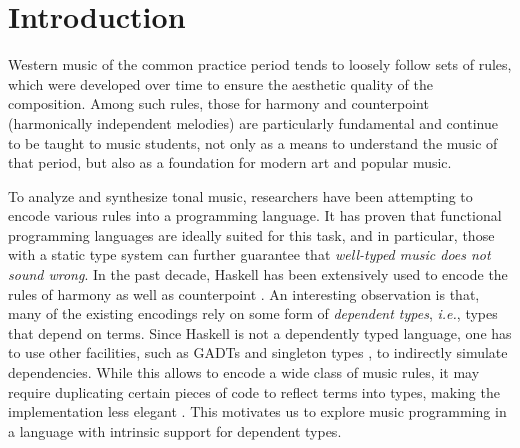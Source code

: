 \documentclass[sigplan,10pt,screen]{acmart}
\begin{document}


\maketitle

\section{Introduction}

Western music of the common practice period tends to loosely
follow sets of rules, which were developed over time to ensure
the aesthetic quality of the composition. 
Among such rules, those for harmony \citep{piston1987harmony}
and counterpoint (harmonically independent melodies) 
\citep{fux1965study} are particularly fundamental and continue 
to be taught to music students, not only as a means to understand 
the music of that period, but also as a foundation for modern art 
and popular music.

To analyze and synthesize tonal music, researchers have been
attempting to encode various rules into a programming language.
It has proven that functional programming languages are
ideally suited for this task, and in particular, those with a static
type system can further guarantee that \emph{well-typed music 
does not sound wrong}.
In the past decade, Haskell has been extensively used to encode
the rules of harmony \citep{fmmh, hihseufha, faamh, hafha, fghm}
as well as counterpoint \citep{szamozvancev2017well}.
An interesting observation is that, many of the existing encodings
rely on some form of \emph{dependent types}, \textit{i.e.},  
types that depend on terms. 
Since Haskell is not a dependently typed language, one has to
use other facilities, such as GADTs \citep{cheney2002lightweight} 
and singleton types \citep{eisenberg2013dependently},
to indirectly simulate dependencies.
While this allows to encode a wide class of music rules, it may
require duplicating certain pieces of code to reflect terms into 
types, making the implementation less elegant 
\citep{monnier2010singleton}.
This motivates us to explore music programming in a language
with intrinsic support for dependent types.
\end{document}
